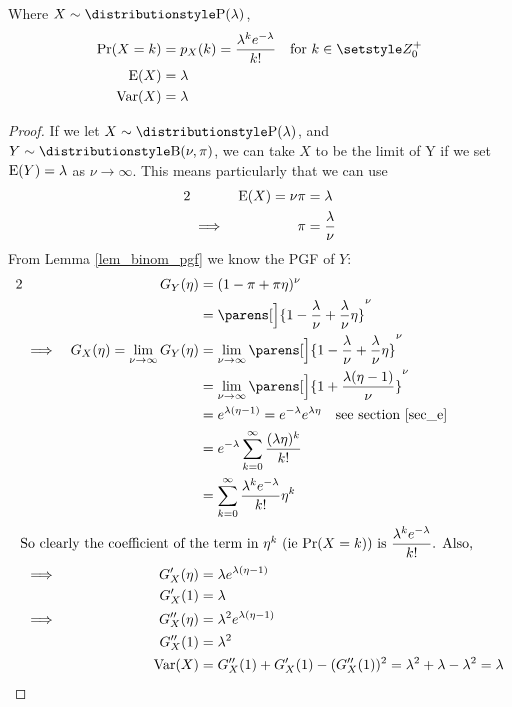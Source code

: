 \begin{theorem}
Where \(X \sim \Poisson(\lambda)\),
\begin{align*}
\Prob(X = k) &= p_X(k) = \frac{\lambda^k e^{-\lambda}}{k!}
    \quad \text{for \(k \in \Integers^+_0\)} \\
\Expect(X) &= \lambda \\
\Var(X) &= \lambda
\end{align*}
\end{theorem}
\begin{proof}
If we let \(X \sim \Poisson(\lambda)\), and \(Y \sim \Binomial(\nu, \pi)\),
we can take \(X\) to be the limit of Y if we set \(\operatorname{E}(Y) = \lambda\)
as \(\nu \to \infty\). This means particularly that we can use
\begin{alignat*}2
&& \Expect(X) = \nu \pi &= \lambda \\
&\implies& \pi &= \frac \lambda \nu
\end{alignat*}
From Lemma \ref{lem_binom_pgf} we know the PGF of \(Y\):
\begin{alignat*}2
&& G_Y(\eta) &= (1 - \pi + \pi \eta)^\nu \\
    &&  &= \parens[\Big]{1 - \frac \lambda \nu + \frac \lambda \nu \eta}^\nu \\
&\implies& G_X(\eta) = \lim_{\nu \to \infty}G_Y(\eta)
    &= \lim_{\nu \to \infty} \parens[\Big]{1 - \frac \lambda \nu
                                 + \frac \lambda \nu \eta}^\nu \\
    &&  &= \lim_{\nu \to \infty} \parens[\Big]{1 + \frac{\lambda(\eta - 1)}\nu}^\nu \\
&&  &= e^{\lambda(\eta - 1)} = e^{-\lambda}e^{\lambda \eta}
    \quad \text{see section \ref{sec_e}} \\
&&  &= e^{-\lambda} \sum_{k = 0}^\infty \frac{(\lambda \eta)^k}{k!} \\
&&  &= \sum_{k = 0}^\infty \frac{\lambda ^k e^{-\lambda}}{k!} \eta^k \\
\intertext{
So clearly the coefficient of the term in \(\eta^k\) (ie \(\Prob(X = k)\)) is
\(\dfrac{\lambda^k e^{-\lambda}}{k!}\). Also,}
&\implies& G_X'(\eta) &= \lambda e^{\lambda(\eta - 1)} \\
&& G_X'(1) &= \lambda \\
&\implies& G_X''(\eta) &= \lambda^2 e^{\lambda(\eta - 1)} \\
&& G_X''(1) &= \lambda^2 \\
&& \Var(X) &= G_X''(1) + G_X'(1) - (G_X''(1))^2
    = \lambda^2 + \lambda - \lambda^2 = \lambda \qedhere
\end{alignat*}
\end{proof}

